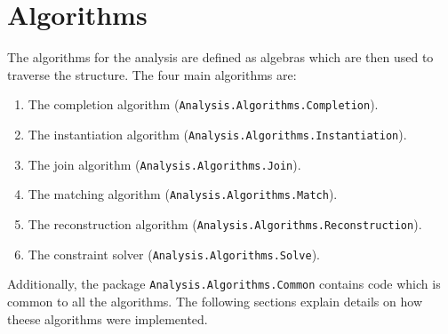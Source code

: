 \documentclass[8pt]{extarticle}
\begin{document}
\section{Algorithms}
The algorithms for the analysis are defined as algebras which are then used to traverse the structure. The four main algorithms are:
\begin{enumerate}
\item The completion algorithm (\verb+Analysis.Algorithms.Completion+).
\item The instantiation algorithm (\verb+Analysis.Algorithms.Instantiation+).
\item The join algorithm (\verb+Analysis.Algorithms.Join+).
\item The matching algorithm (\verb+Analysis.Algorithms.Match+).
\item The reconstruction algorithm (\verb+Analysis.Algorithms.Reconstruction+).
\item The constraint solver (\verb+Analysis.Algorithms.Solve+).
\end{enumerate}
Additionally, the package \verb+Analysis.Algorithms.Common+ contains code which is common to all the algorithms. The following sections explain details on how theese algorithms were implemented.
\end{document}
